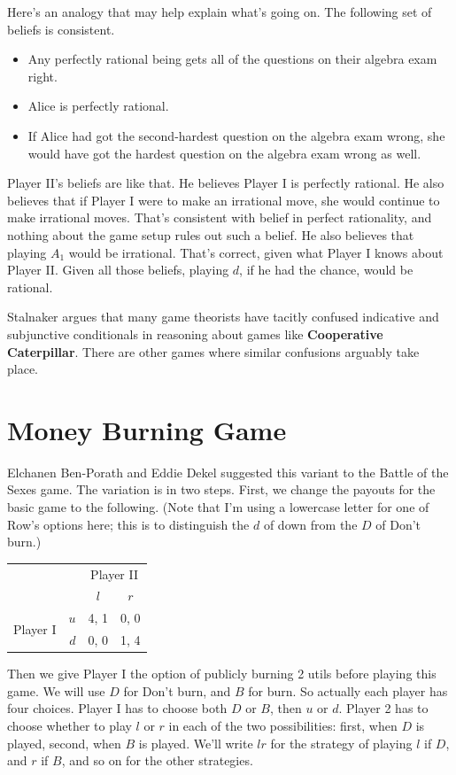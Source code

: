 \documentclass[openany]{book}
\begin{document}
Here's an analogy that may help explain what's going on. The following set of beliefs is consistent.
\begin{itemize}
\item Any perfectly rational being gets all of the questions on their algebra exam right.
\item Alice is perfectly rational.
\item If Alice had got the second-hardest question on the algebra exam wrong, she would have got the hardest question on the algebra exam wrong as well.
\end{itemize}
 Player II's beliefs are like that. He believes Player I is perfectly rational. He also believes that if Player I were to make an irrational move, she would continue to make irrational moves. That's consistent with belief in perfect rationality, and nothing about the game setup rules out such a belief. He also believes that playing $A_1$ would be irrational. That's correct, given what Player I knows about Player II. Given all those beliefs, playing $d$, if he had the chance, would be rational.

Stalnaker argues that many game theorists have tacitly confused indicative and subjunctive conditionals in reasoning about games like \textbf{Cooperative Caterpillar}. There are other games where similar confusions arguably take place.

\section*{Money Burning Game}
Elchanen Ben-Porath and Eddie Dekel suggested this variant to the Battle of the Sexes game. The variation is in two steps. First, we change the payouts for the basic game to the following. (Note that I'm using a lowercase letter for one of Row's options here; this is to distinguish the $d$ of down from the $D$ of Don't burn.)

\begin{center}
\begin{tabular}{l r | c c}
& & \multicolumn{2}{c}{Player II} \\
& & $l$ & $r$ \\ \hline
\multirow{2}{*}{Player I}
& $u$ & 4, 1 & 0, 0 \\
& $d$ & 0, 0 & 1, 4 \\
\end{tabular}
\end{center}
Then we give Player I the option of publicly burning 2 utils before playing this game. We will use $D$ for Don't burn, and $B$ for burn. So actually each player has four choices. Player I has to choose both $D$ or $B$, then $u$ or $d$. Player 2 has to choose whether to play $l$ or $r$ in each of the two possibilities: first, when $D$ is played, second, when $B$ is played. We'll write $lr$ for the strategy of playing $l$ if $D$, and $r$ if $B$, and so on for the other strategies.
\end{document}
